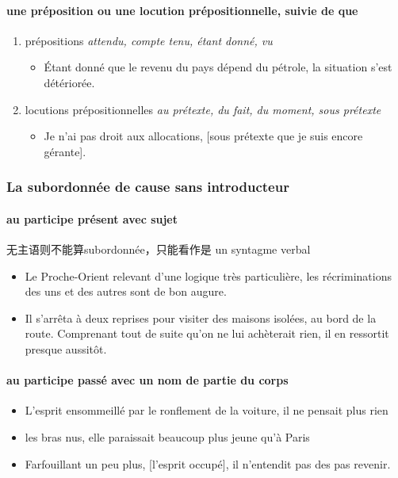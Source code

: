 \documentclass[UTF8]{report}
\begin{document}
\paragraph{une préposition ou une locution prépositionnelle, suivie de que }
\begin{enumerate}
    \item prépositions \textit{attendu, compte tenu, étant donné, vu}
    \begin{itemize}
        \item Étant donné que le revenu du pays dépend du pétrole, la situation s’est détériorée.
    \end{itemize}
    \item locutions prépositionnelles \textit{au prétexte, du fait, du moment, sous prétexte}
    \begin{itemize}
        \item Je n’ai pas droit aux allocations, [sous prétexte que je suis encore gérante].
    \end{itemize}
\end{enumerate}

\subsubsection{La subordonnée de cause sans introducteur}
\paragraph{au participe présent avec sujet}
无主语则不能算subordonnée，只能看作是 un syntagme verbal
\begin{itemize}
    \item Le Proche-Orient relevant d’une logique très particulière, les récriminations des uns et des autres sont de bon augure.
    \item Il s’arrêta à deux reprises pour visiter des maisons isolées, au bord de la route. Comprenant tout de suite qu’on ne lui achèterait rien, il en ressortit presque aussitôt.
\end{itemize}

\paragraph{au participe passé avec un nom de partie du corps}
\begin{itemize}
    \item L’esprit ensommeillé par le ronflement de la voiture, il ne pensait plus rien
    \item les bras nus, elle paraissait beaucoup plus jeune qu’à Paris
    \item Farfouillant un peu plus, [l’esprit occupé], il n’entendit pas des pas revenir. 
\end{itemize}
\end{document}
